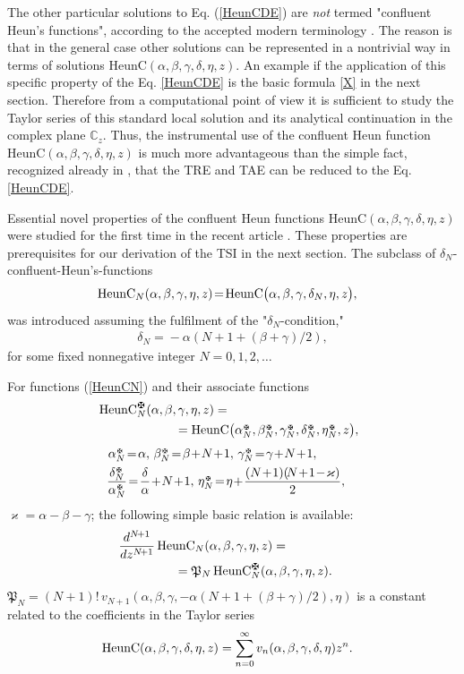 \documentclass[prd,aps,twocolumn,leterpaper,preprintnumbers]{revtex4}
\numberwithin{equation}{section}
\newcommand{\ben}{\begin{eqnarray}}
\newcommand{\een}{\end{eqnarray}}
\newcommand{\la}{\label}
\begin{document}
The other particular solutions to Eq. (\ref{HeunCDE})
are {\em not} termed "confluent Heun's functions",
according to the accepted modern terminology \cite{Heun}.
The reason is that in the general case other solutions can be represented in a
nontrivial way in terms of solutions $\text{HeunC}(\alpha,\beta,\gamma,\delta,\eta,z)$.
An example if the application of this specific property of the Eq. \eqref{HeunCDE}
is the basic formula \eqref{X} in the next section.
Therefore from a computational point of view it is sufficient to study
the Taylor series  of this standard local solution
and its analytical continuation in the complex plane $\mathbb{C}_z$.
Thus, the instrumental use of the confluent Heun function
$\text{HeunC}(\alpha,\beta,\gamma,\delta,\eta,z)$
is much more advantageous than the simple fact, recognized already in \cite{TME_Heun},
that the TRE and TAE can be reduced to the Eq. \eqref{HeunCDE}.

Essential novel properties of the confluent Heun functions
$\text{HeunC}(\alpha,\beta,\gamma,\delta,\eta,z)$ were
studied for the first time in the recent article \cite{Fiziev2}.
These properties are prerequisites for our derivation of the TSI in the next section.
The subclass of $\delta_N$-confluent-Heun's-functions
%
\ben
\la{HeunCN}
\text{HeunC}_N(\alpha,\beta,\gamma,\eta,z)\!=\!
\text{HeunC}\big(\alpha,\beta,\gamma,\delta_{N},\eta,z\big),\hskip .3truecm
\een
was introduced assuming the fulfilment of the "$\delta_N$-condition,"
\ben
\delta_{N}\!=\!-\alpha\left(N\!+\!1\!+\!(\beta\!+\!\gamma)/2\right),
\la{deltaN}
\een
for some fixed nonnegative integer $N=0, 1, 2,\dots$

For functions (\ref{HeunCN}) and their associate functions
%
\ben
\la{AHeunCN}
\text{HeunC}^\maltese_N(\alpha,\beta,\gamma,\eta,z)=\hskip 3.9truecm \\
=\text{HeunC}\big(\alpha_{N}^{{}_\maltese},\beta_{N}^{{}_\maltese},\gamma_{N}^{{}_\maltese},
\delta_{N}^{{}_\maltese},\eta_{N}^{{}_\maltese},z\big),
\hskip .2truecm \nonumber
\een
\ben
\la{AHeunCNparameters}
\alpha_{N}^{{}_\maltese}\!=\!\alpha,\,\beta_{N}^{{}_\maltese}\!=
\!\beta\!+\!N\!+\!1,\,\gamma_{N}^{{}_\maltese}\!=\!\gamma\!+\!N\!+\!1,
\hskip 1.2truecm \\
{\frac{\delta_{N}^{{}_\maltese}}{\alpha_{N}^{{}_\maltese}}}\!=\!{\frac{\delta}{\alpha}}\!+\!N\!+\!1,\,
\eta_{N}^{{}_\maltese}\!=\!\eta\!+\!{\frac {(N\!+\!1)(\!N\!+\!1\!-\!\varkappa)} 2},
\hskip .4truecm \nonumber
\een
$\varkappa\!=\!\alpha\!-\!\beta\!-\!\gamma$; the following simple basic relation is available:
\ben
\la{HHn_maltese}
{\frac{d^{N\!+1} }{dz^{N\!+1}}}\,\text{HeunC}_N(\alpha,\beta,\gamma,\eta,z)=\hskip 1.7truecm\\
=\mathfrak{P}_N\, \text{HeunC}^\maltese_N(\alpha,\beta,\gamma,\eta,z).
\hskip .4truecm\nonumber
\een
$\mathfrak{P}_N\!=\!(\!N\!+\!1\!)!\,v_{N\!+1}(\alpha,\beta,\gamma,
-\alpha\left(N\!+\!1\!+\!(\beta\!+\!\gamma)/2\right),\eta)$
is a constant related to the coefficients in the Taylor series
%
\ben
\text{HeunC}(\alpha,\beta,\gamma,\delta,\eta,z)=
\sum_{n=0}^\infty v_{n}(\alpha,\beta,\gamma,\delta,\eta)z^n.\hskip .3truecm
\la{HeunC}
\een
%
\end{document}
